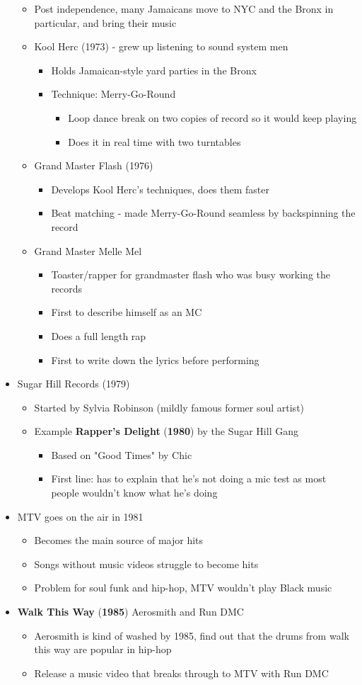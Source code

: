 \documentclass[11pt]{report}
\newcommand{\imp}[1]{\textbf{#1}}
\newcommand{\idate}[2]{\textcolor{blue!50}{\imp{#1}}\label{date:#2}}
\newcommand{\bl}{\begin{itemize}}
\newcommand{\kl}{\end{itemize}}
\newcommand{\song}[2]{\textcolor{red!70}{\textbf{#1}} (\idate{#2}{#1})}
\begin{document}
\begin{itemize}
	\bl
		\item Post independence, many Jamaicans move to NYC and the Bronx in particular, and bring their music
		\item Kool Herc (1973) - grew up listening to sound system men
		\bl
			\item Holds Jamaican-style yard parties in the Bronx
			\item Technique: Merry-Go-Round
			\bl
				\item Loop dance break on two copies of record so it would keep playing
				\item Does it in real time with two turntables
			\kl
		\kl
		\item Grand Master Flash (1976)
		\bl
			\item Develops Kool Herc's techniques, does them faster
			\item Beat matching - made Merry-Go-Round seamless by backspinning the record
		\kl
		\item Grand Master Melle Mel
		\bl
			\item Toaster/rapper for grandmaster flash who was busy working the records
			\item First to describe himself as an MC
			\item Does a full length rap
			\item First to write down the lyrics before performing
		\kl
	\kl
	\item Sugar Hill Records (1979)
	\bl
		\item Started by Sylvia Robinson (mildly famous former soul artist)
		\item Example \song{Rapper's Delight}{1980} by the Sugar Hill Gang
		\bl
			\item Based on "Good Times" by Chic
			\item First line: has to explain that he's not doing a mic test as most people wouldn't know what he's doing
		\kl
	\kl
	\item MTV goes on the air in 1981
	\bl
		\item Becomes the main source of major hits
		\item Songs without music videos struggle to become hits
		\item Problem for soul funk and hip-hop, MTV wouldn't play Black music
	\kl
	\item \song{Walk This Way}{1985} Aerosmith and Run DMC
	\bl
		\item Aerosmith is kind of washed by 1985, find out that the drums from walk this way are popular in hip-hop
		\item Release a music video that breaks through to MTV with Run DMC
	\kl
\end{itemize}
\end{document}
